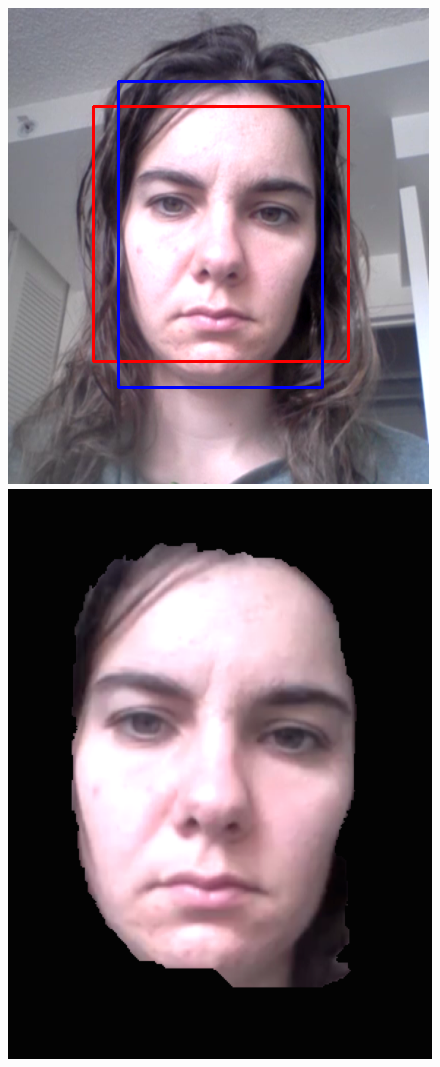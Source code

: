 \documentclass[10pt,twocolumn,letterpaper]{article}
\begin{document}
\begin{figure}
\begin{center}
	\includegraphics[scale=0.25]{figures/segment_bb}\\
	\includegraphics[scale=0.25]{figures/my_seg_it1}

\end{center}
\end{figure}
\end{document}
